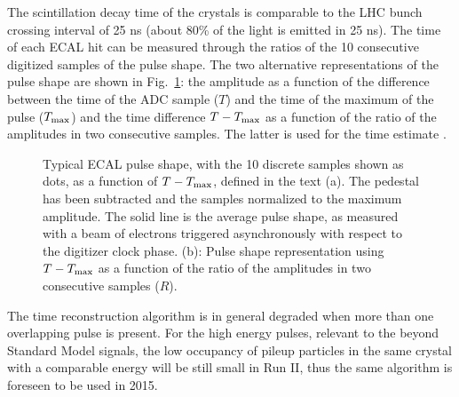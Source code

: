 \documentclass[journal]{IEEEtran}
\begin{document}
The scintillation decay time of the crystals is comparable to the LHC bunch crossing interval of 25 ns (about 80\% of the light is emitted in 25 ns). The time of each ECAL hit can be measured through the ratios of the 10 consecutive digitized samples of the pulse shape. The two alternative representations of the pulse shape are shown in Fig.~\ref{fig:pulse_shapes_funcs}: the amplitude as a function of the difference between the time of the ADC sample ($T$) and the time of the maximum of the pulse ($T_{\rm max}$) and the time difference $T-T_{\rm max}$ as a function of the ratio of the amplitudes in two consecutive samples. The latter is used for the time estimate \cite{Chatrchyan:2009aj}.  
%
\begin{figure}[!t]
  \begin{center}
    \caption{Typical ECAL pulse shape, with the 10 discrete samples shown as dots, as a function of $T-T_{\rm max}$, defined in the text (a). The pedestal has been subtracted and the samples normalized to the maximum amplitude. The solid line is the average pulse shape, as measured with a beam of electrons triggered asynchronously with respect to the digitizer clock phase. (b): Pulse shape representation using $T-T_{\rm max}$ as a function of the ratio of the amplitudes in two consecutive samples ($R$). \label{fig:pulse_shapes_funcs}}
  \end{center}
\end{figure}
%
The time reconstruction algorithm is in general degraded when more than one overlapping pulse is present.  For the high energy pulses, relevant to the beyond Standard Model signals, the low occupancy of pileup particles in the same crystal with a comparable energy will be still small in Run II, thus the same algorithm is foreseen to be used in 2015.
\end{document}
